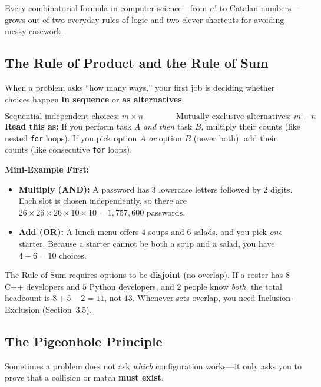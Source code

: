 \documentclass[11pt,a4paper]{article}
\theoremstyle{definition}
\newcommand{\examplebeat}{\textbf{\color{primaryblue}Mini-Example First:} }
\begin{document}
Every combinatorial formula in computer science---from $n!$ to Catalan numbers---grows out of two everyday rules of logic and two clever shortcuts for avoiding messy casework.

\subsection{The Rule of Product and the Rule of Sum}

When a problem asks ``how many ways,'' your first job is deciding whether choices happen \textbf{in sequence} or \textbf{as alternatives}.

\begin{formulabox}
\[
    \text{Sequential independent choices: } m \times n \qquad\qquad
    \text{Mutually exclusive alternatives: } m + n
\]
\textbf{Read this as:} If you perform task $A$ \emph{and then} task $B$, multiply their counts (like nested \texttt{for} loops). If you pick option $A$ \emph{or} option $B$ (never both), add their counts (like consecutive \texttt{for} loops).
\end{formulabox}

\examplebeat
\begin{itemize}
    \item \textbf{Multiply (AND):} A password has $3$ lowercase letters followed by $2$ digits. Each slot is chosen independently, so there are $26 \times 26 \times 26 \times 10 \times 10 = 1{,}757{,}600$ passwords.
    \item \textbf{Add (OR):} A lunch menu offers $4$ soups and $6$ salads, and you pick \emph{one} starter. Because a starter cannot be both a soup and a salad, you have $4 + 6 = 10$ choices.
\end{itemize}

\begin{watchoutbox}
The Rule of Sum requires options to be \textbf{disjoint} (no overlap). If a roster has $8$ C++ developers and $5$ Python developers, and $2$ people know \emph{both}, the total headcount is $8 + 5 - 2 = 11$, not $13$. Whenever sets overlap, you need Inclusion-Exclusion (Section~3.5).
\end{watchoutbox}

\subsection{The Pigeonhole Principle}

Sometimes a problem does not ask \emph{which} configuration works---it only asks you to prove that a collision or match \textbf{must exist}.
\end{document}
